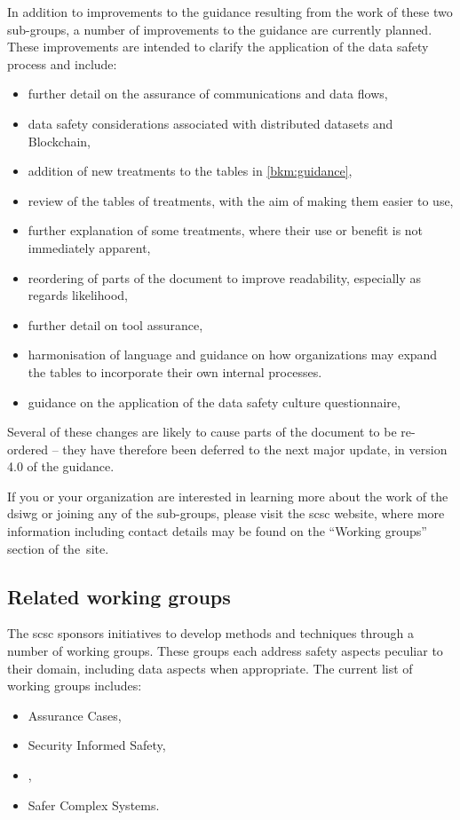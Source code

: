 In addition to improvements to the guidance resulting from the work of these two sub-groups,
a number of improvements to the guidance are currently planned.
These improvements are intended to clarify the application of the data safety process
and include:
\begin{itemize}
\item further detail on the assurance of communications and data flows,
\item data safety considerations associated with distributed \glspl{dataset} and Blockchain,
\item addition of new \glspl{treatment} to the tables in \autoref{bkm:guidance},
\item review of the tables of \glspl{treatment}, with the aim of making them easier to use,
\item further explanation of some \glspl{treatment}, where their use or benefit is not immediately apparent, 
\item reordering of parts of the document to improve readability, especially as regards likelihood, 
\item further detail on tool assurance,
\item harmonisation of language and guidance on how organizations may expand the tables to incorporate their own internal processes.
\item guidance on the application of the data safety culture questionnaire,
\end{itemize}
Several of these changes are likely to
cause parts of the document to be re-ordered -- they have therefore been deferred to the next major update, in version 4.0 of the guidance.

If you or your organization are interested in learning more about the work of the \gls{dsiwg} or joining any of the sub-groups,
please visit the \gls{scsc} website, where more information including contact details may be found on the ``Working groups'' section of the\cbstart\ site.\cbend
%
%
%
\subsection*{Related working groups}
\cbstart The \gls{scsc} sponsors initiatives to develop methods and techniques through a number of working groups. These groups each address safety aspects peculiar to their domain, including data aspects when appropriate. The current list of working groups includes:
%
\begin{itemize}
  \item Assurance Cases,
\cbstart  \item Security Informed Safety,\cbend
  \item {},
  \item Safer Complex Systems. 
\end{itemize}
%
\cbend
%
\clearpage
%

